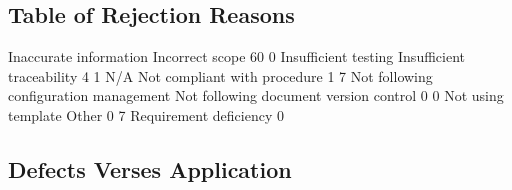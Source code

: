 \documentclass{article}
\begin{document}
\subsection{Table of Rejection Reasons}
\begin{Schunk}
\begin{Soutput}
                Inaccurate information                        Incorrect scope 
                                    60                                      0 
                  Insufficient testing              Insufficient traceability 
                                     4                                      1 
                                   N/A           Not compliant with procedure 
                                     1                                      7 
Not following configuration management Not following document version control 
                                     0                                      0 
                    Not using template                                  Other 
                                     0                                      7 
                Requirement deficiency 
                                     0 
\end{Soutput}
\end{Schunk}

\subsection{Defects Verses Application}
\end{document}
